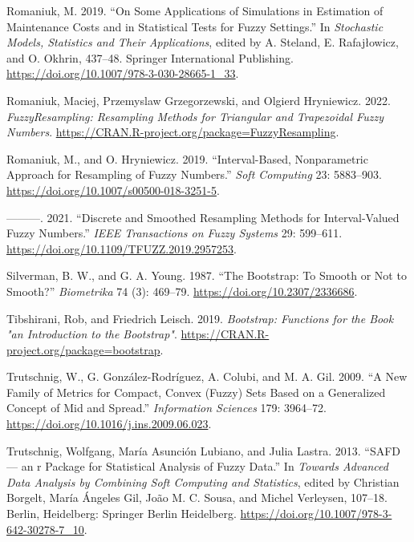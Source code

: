 \begin{CSLReferences}{1}{0}
\leavevmode{}%
Romaniuk, M. 2019. {``On Some Applications of Simulations in Estimation of Maintenance Costs and in Statistical Tests for Fuzzy Settings.''} In \emph{Stochastic Models, Statistics and Their Applications}, edited by A. Steland, E. Rafajłowicz, and O. Okhrin, 437--48. Springer International Publishing. \url{https://doi.org/10.1007/978-3-030-28665-1_33}.

\leavevmode{}%
Romaniuk, Maciej, Przemyslaw Grzegorzewski, and Olgierd Hryniewicz. 2022. \emph{FuzzyResampling: Resampling Methods for Triangular and Trapezoidal Fuzzy Numbers}. \url{https://CRAN.R-project.org/package=FuzzyResampling}.

\leavevmode{}%
Romaniuk, M., and O. Hryniewicz. 2019. {``Interval-Based, Nonparametric Approach for Resampling of Fuzzy Numbers.''} \emph{Soft Computing} 23: 5883--903. \url{https://doi.org/10.1007/s00500-018-3251-5}.

\leavevmode{}%
---------. 2021. {``Discrete and Smoothed Resampling Methods for Interval-Valued Fuzzy Numbers.''} \emph{IEEE Transactions on Fuzzy Systems} 29: 599--611. \url{https://doi.org/10.1109/TFUZZ.2019.2957253}.

\leavevmode{}%
Silverman, B. W., and G. A. Young. 1987. {``The Bootstrap: To Smooth or Not to Smooth?''} \emph{Biometrika} 74 (3): 469--79. \url{https://doi.org/10.2307/2336686}.

\leavevmode{}%
Tibshirani, Rob, and Friedrich Leisch. 2019. \emph{Bootstrap: Functions for the Book "an Introduction to the Bootstrap"}. \url{https://CRAN.R-project.org/package=bootstrap}.

\leavevmode{}%
Trutschnig, W., G. González-Rodríguez, A. Colubi, and M. A. Gil. 2009. {``A New Family of Metrics for Compact, Convex (Fuzzy) Sets Based on a Generalized Concept of Mid and Spread.''} \emph{Information Sciences} 179: 3964--72. \url{https://doi.org/10.1016/j.ins.2009.06.023}.

\leavevmode{}%
Trutschnig, Wolfgang, María Asunción Lubiano, and Julia Lastra. 2013. {``SAFD --- an r Package for Statistical Analysis of Fuzzy Data.''} In \emph{Towards Advanced Data Analysis by Combining Soft Computing and Statistics}, edited by Christian Borgelt, María Ángeles Gil, João M. C. Sousa, and Michel Verleysen, 107--18. Berlin, Heidelberg: Springer Berlin Heidelberg. \url{https://doi.org/10.1007/978-3-642-30278-7_10}.

\end{CSLReferences}

